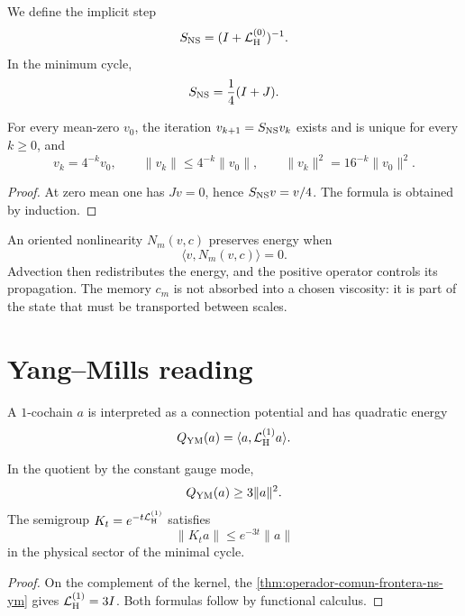 We define the implicit step
\[
 S_{\rm NS}=(I+\mathcal L_{\rm H}^{(0)})^{-1}.
\]
In the minimum cycle,
\[
 S_{\rm NS}=\frac14(I+J).
\]

\begin{theorem}
\label{thm:contraccion-flujo-finito}
For every mean-zero \(v_0\), the iteration
\(v_{k+1}=S_{\rm NS}v_k\) exists and is unique for every \(k\geq0\), and
\[
 v_k=4^{-k}v_0,
 \qquad
 \|v_k\|\leq4^{-k}\|v_0\|,
 \qquad
 \|v_k\|^2=16^{-k}\|v_0\|^2.
\]
\end{theorem}

\begin{proof}
At zero mean one has \(Jv=0\), hence
\(S_{\rm NS}v=v/4\). The formula is obtained by induction.
\end{proof}

An oriented nonlinearity \(N_m(v,c)\) preserves energy when
\[
 \langle v,N_m(v,c)\rangle=0.
\]
Advection then redistributes the energy, and the positive operator controls
its propagation. The memory \(c_m\) is not absorbed into a chosen viscosity:
it is part of the state that must be transported between scales.

\begingroup
\setlength{\parskip}{0pt}
\setlength{\abovedisplayskip}{.25\baselineskip}
\setlength{\belowdisplayskip}{.25\baselineskip}
\setlength{\abovedisplayshortskip}{.12\baselineskip}
\setlength{\belowdisplayshortskip}{.18\baselineskip}
\section{Yang--Mills reading}

A \(1\)-cochain \(a\) is interpreted as a connection potential and has
quadratic energy
\[
 Q_{\rm YM}(a)=\langle a,\mathcal L_{\rm H}^{(1)}a\rangle.
\]

\begin{theorem}
\label{thm:coercividad-gap-gauge-finito}
In the quotient by the constant gauge mode,
\[
 Q_{\rm YM}(a)\geq3\|a\|^2.
\]
The semigroup \(K_t=e^{-t\mathcal L_{\rm H}^{(1)}}\) satisfies
\[
 \|K_ta\|\leq e^{-3t}\|a\|
\]
in the physical sector of the minimal cycle.
\end{theorem}

\begin{proof}
On the complement of the kernel, the
\cref{thm:operador-comun-frontera-ns-ym} gives
\(\mathcal L_{\rm H}^{(1)}=3I\). Both formulas
follow by functional calculus.
\end{proof}

